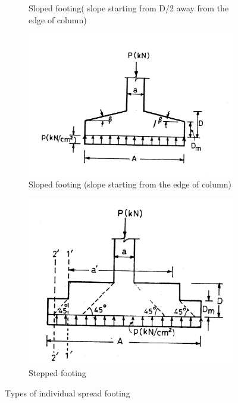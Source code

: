 \begin{figure}
\begin{subfigure}[b]{0.5\textwidth}
    \caption{Sloped footing( slope starting from D/2 away from the edge of column)}
    \label{Slopedfooting}
  \end{subfigure}
 \begin{subfigure}[b]{0.5\textwidth}
    \includegraphics[width=\textwidth]{images/fig2293.png}
    \caption{Sloped footing (slope starting from the edge of column)}
    \label{slopefooting}
  \end{subfigure}
\begin{subfigure}[b]{0.5\textwidth}
    \includegraphics[width=\textwidth]{images/fig2294.png}
    \caption{Stepped footing}
    \label{steppedfooting}
  \end{subfigure}
\caption{Types of individual spread footing}
\label{Types-of-individual-spread-footing}
\end{figure}

